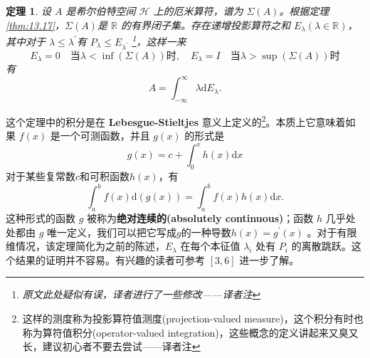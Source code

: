 \documentclass[hyperref,UTF8]{ctexbook}
\newtheorem{theorem}{定理}[chapter]
\begin{document}
\begin{theorem}\label{thm:13.19}
    设 \(A\) 是希尔伯特空间 \(\mathcal{H}\) 上的厄米算符，谱为 \(\Sigma(A)\)。根据定理 \ref{thm:13.17}，\(\Sigma(A)\)是 \(\mathbb{R}\) 的有界闭子集。存在递增投影算符之和 \(E_{\lambda}(\lambda \in \mathbb{R})\)，其中对于 \(\lambda \leq \lambda^{\prime}\)有 \(P_{\lambda} \leq E_{\lambda^{\prime}}\) \footnote{原文此处疑似有误，译者进行了一些修改——译者注}，这样一来
\[
E_{\lambda}=0 \quad \text {当} \lambda<\inf (\Sigma(A))\text{时}, \quad E_{\lambda}=I \quad \text {当} \lambda>\sup (\Sigma(A))\text{时}
\]
有
\[
A=\int_{-\infty}^{\infty} \lambda \mathrm{d} E_{\lambda} .
\]
\end{theorem}

这个定理中的积分是在 \textbf{Lebesgue-Stieltjes} 意义上定义的\footnote{这样的测度称为投影算符值测度(projection-valued measure)，这个积分有时也称为算符值积分(operator-valued integration)，这些概念的定义讲起来又臭又长，建议初心者不要去尝试——译者注}。本质上它意味着如果 \(f(x)\) 是一个可测函数，并且 \(g(x)\) 的形式是
\[
g(x)=c+\int_{0}^{x} h(x) \mathrm{d} x
\]
对于某些复常数\(c\)和可积函数\(h(x)\)，有
\[
\int_{a}^{b} f(x) \mathrm{d}(g(x))=\int_{a}^{b} f(x) h(x) \mathrm{d} x .
\]
这种形式的函数 \(g\) 被称为\textbf{绝对连续的(absolutely continuous)}；函数 \(h\) 几乎处处都由 \(g\) 唯一定义，我们可以把它写成\(g\)的一种导数\(h(x)=g^{\prime}(x)\) 。对于有限维情况，该定理简化为之前的陈述，\(E_{\lambda}\) 在每个本征值 \(\lambda_{i}\) 处有 \(P_{i}\) 的离散跳跃。这个结果的证明并不容易。有兴趣的读者可参考 \([3,6]\) 进一步了解。
\end{document}
